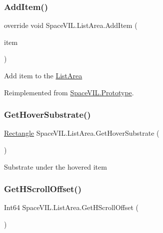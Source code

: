 \subsubsection{\texorpdfstring{Add\+Item()}{AddItem()}}
{\footnotesize\ttfamily override void Space\+V\+I\+L.\+List\+Area.\+Add\+Item (\begin{DoxyParamCaption}\item[{\mbox{\hyperlink{interface_space_v_i_l_1_1_core_1_1_i_base_item}{I\+Base\+Item}}}]{item }\end{DoxyParamCaption})\hspace{0.3cm}{\ttfamily [virtual]}}



Add item to the \mbox{\hyperlink{class_space_v_i_l_1_1_list_area}{List\+Area}} 



Reimplemented from \mbox{\hyperlink{class_space_v_i_l_1_1_prototype}{Space\+V\+I\+L.\+Prototype}}.

\mbox{\label{class_space_v_i_l_1_1_list_area_af2b6ef18d4cbaea198704bf1d0dac97a}} 
\subsubsection{\texorpdfstring{Get\+Hover\+Substrate()}{GetHoverSubstrate()}}
{\footnotesize\ttfamily \mbox{\hyperlink{class_space_v_i_l_1_1_rectangle}{Rectangle}} Space\+V\+I\+L.\+List\+Area.\+Get\+Hover\+Substrate (\begin{DoxyParamCaption}{ }\end{DoxyParamCaption})}



Substrate under the hovered item 

\mbox{\label{class_space_v_i_l_1_1_list_area_afa9d172433e60b22c5220c06acff38fd}} 
\subsubsection{\texorpdfstring{Get\+H\+Scroll\+Offset()}{GetHScrollOffset()}}
{\footnotesize\ttfamily Int64 Space\+V\+I\+L.\+List\+Area.\+Get\+H\+Scroll\+Offset (\begin{DoxyParamCaption}{ }\end{DoxyParamCaption})}



